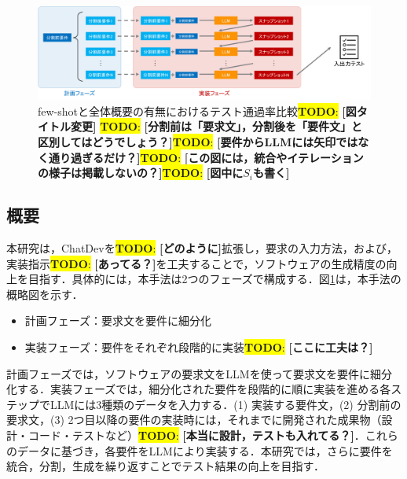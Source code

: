 \documentclass[submit,techrep,noauthor]{ipsj}
\newcommand{\todo}[1]{\colorbox{yellow}{{\bf TODO}:}{\color{red} {\textbf{[#1]}}}}
\begin{document}
\begin{figure}[t]
    \centering
    \includegraphics[width=1.0\linewidth]{./Toyoshima_fig/approach_abst_v2.pdf}
    \caption{few-shotと全体概要の有無におけるテスト通過率比較\todo{図タイトル変更}
    \todo{分割前は「要求文」，分割後を「要件文」と区別してはどうでしょう？}\todo{要件からLLMには矢印ではなく通り過ぎるだけ？}\todo{この図には，統合やイテレーションの様子は掲載しないの？}\todo{図中に$S_i$も書く}}
    \label{approach_abst}
\end{figure}

\subsection{概要}

本研究は，ChatDevを\todo{どのように}拡張し，要求の入力方法，および，実装指示\todo{あってる？}を工夫することで，ソフトウェアの生成精度の向上を目指す．具体的には，本手法は2つのフェーズで構成する．図\ref{approach_abst}は，本手法の概略図を示す．
\begin{itemize}
\item 計画フェーズ：要求文を要件に細分化
\item 実装フェーズ：要件をそれぞれ段階的に実装\todo{ここに工夫は？}
\end{itemize}

計画フェーズでは，ソフトウェアの要求文をLLMを使って要求文を要件に細分化する．実装フェーズでは，細分化された要件を段階的に順に実装を進める各ステップでLLMには3種類のデータを入力する．(1) 実装する要件文，(2) 分割前の要求文，(3) 2つ目以降の要件の実装時には，それまでに開発された成果物（設計・コード・テストなど）\todo{本当に設計，テストも入れてる？}．これらのデータに基づき，各要件をLLMにより実装する．本研究では，さらに要件を統合，分割，生成を繰り返すことでテスト結果の向上を目指す．

\end{document}
